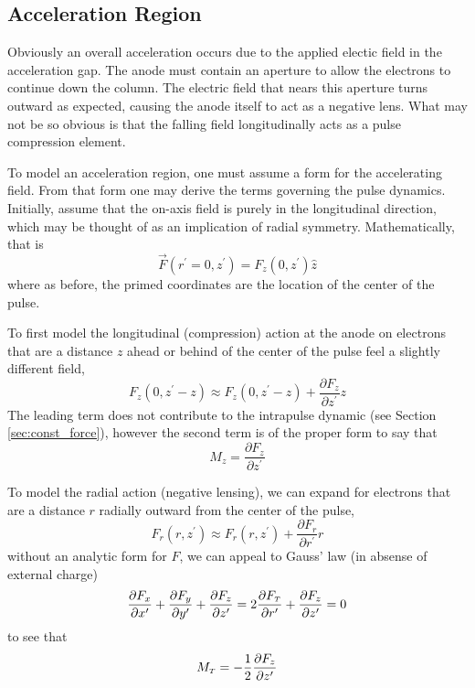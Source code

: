 \subsection{Acceleration Region}

Obviously an overall acceleration occurs due to the applied electic field in the acceleration gap.
The anode must contain an aperture to allow the electrons to continue down the column.
The electric field that nears this aperture turns outward as expected, causing the anode itself to act as a negative lens. %
What may not be so obvious is that the falling field longitudinally acts as a pulse compression element.

To model an acceleration region, one must assume a form for the accelerating field.
From that form one may derive the terms governing the pulse dynamics. Initially, assume that the on-axis field is purely in the longitudinal direction, which may be thought of as an implication of radial symmetry.
Mathematically, that is
\begin{equation}
  \vec{F}(r^{\prime}=0,z^{\prime}) = F_z (0,z^{\prime}) \hat{z}
\end{equation}
where as before, the primed coordinates are the location of the center of the pulse.

To first model the longitudinal (compression) action at the anode %
on electrons that are a distance $z$ ahead or behind of the center of the pulse feel a slightly different field, 
\begin{equation}
  F_z(0,z^{\prime} - z) \approx F_z(0,z^{\prime} - z) + \frac{\partial F_z}{\partial z^{\prime}} z
\end{equation}
The leading term does not contribute to the intrapulse dynamic (see Section \ref{sec:const_force}), however the second term is of the proper form to say that
\begin{equation}
  M_z = \frac{\partial F_z}{\partial z^{\prime}}
\end{equation}

To model the radial action (negative lensing), we can expand for electrons that are a distance $r$ radially outward from the center of the pulse,
\begin{equation}
  F_r(r,z^{\prime}) \approx F_r(r,z^{\prime}) + \frac{\partial F_r}{\partial r^{\prime}} r
\end{equation}
without an analytic form for $F$, we can appeal to Gauss' law (in absense of external charge)
\begin{equation}
  \frac{\partial F_x}{\partial x^{\prime}} + \frac{\partial F_y}{\partial y^{\prime}} + \frac{\partial F_z}{\partial z^{\prime}} = 2 \frac{\partial F_{{\scriptscriptstyle T}}}{\partial r^{\prime}} + \frac{\partial F_z}{\partial z^{\prime}} = 0
\end{equation}
to see that
\begin{equation}
  M_{{\scriptscriptstyle T}} = -\frac{1}{2}\frac{\partial F_z}{\partial z^{\prime}}
\end{equation}


